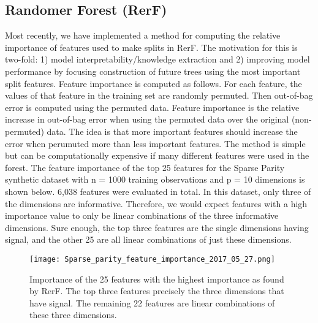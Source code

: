 \documentclass[simplex.tex]{subfiles}
\begin{document}
\subsection[Randomer Forest]{Randomer Forest (RerF)}

Most recently, we have implemented a method for computing the relative importance of features used to make splits in RerF. The motivation for this is two-fold: 1) model interpretability/knowledge extraction and 2) improving model performance by focusing construction of future trees using the most important split features. Feature importance is computed as follows. For each feature, the values of that feature in the training set are randomly permuted. Then out-of-bag error is computed using the permuted data. Feature importance is the relative increase in out-of-bag error when using the permuted data over the original (non-permuted) data. The idea is that more important features should increase the error when perumuted more than less important features. The method is simple but can be computationally expensive if many different features were used in the forest. The feature importance of the top 25 features for the Sparse Parity synthetic dataset with n = 1000 training observations and p = 10 dimensions is shown below. 6,038 features were evaluated in total. In this dataset, only three of the dimensions are informative. Therefore, we would expect features with a high importance value to only be linear combinations of the three informative dimensions. Sure enough, the top three features are the single dimensions having signal, and the other 25 are all linear combinations of just these dimensions. 

\begin{figure}[h!]
\begin{cframed}
\centering
\texttt{[image: Sparse\_parity\_feature\_importance\_2017\_05\_27.png]}
\caption{
Importance of the 25 features with the highest importance as found by RerF. The top three features precisely the three dimensions that have signal. The remaining 22 features are linear combinations of these three dimensions.
}
\label{fig:RefF3}
\end{cframed}
\end{figure}

\end{document}
